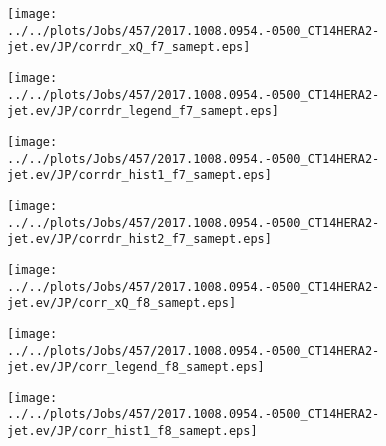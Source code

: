 \documentclass[12pt]{article}
\begin{document}
\begin{figure}
\texttt{[image: ../../plots/Jobs/457/2017.1008.0954.-0500\_CT14HERA2-jet.ev/JP/corrdr\_xQ\_f7\_samept.eps]}
\caption{}
\end{figure}\newpage\clearpage
\begin{figure}
\texttt{[image: ../../plots/Jobs/457/2017.1008.0954.-0500\_CT14HERA2-jet.ev/JP/corrdr\_legend\_f7\_samept.eps]}
\caption{}
\end{figure}\newpage\clearpage
\begin{figure}
\texttt{[image: ../../plots/Jobs/457/2017.1008.0954.-0500\_CT14HERA2-jet.ev/JP/corrdr\_hist1\_f7\_samept.eps]}
\caption{}
\end{figure}\newpage\clearpage
\begin{figure}
\texttt{[image: ../../plots/Jobs/457/2017.1008.0954.-0500\_CT14HERA2-jet.ev/JP/corrdr\_hist2\_f7\_samept.eps]}
\caption{}
\end{figure}\newpage\clearpage
\begin{figure}
\texttt{[image: ../../plots/Jobs/457/2017.1008.0954.-0500\_CT14HERA2-jet.ev/JP/corr\_xQ\_f8\_samept.eps]}
\caption{}
\end{figure}\newpage\clearpage
\begin{figure}
\texttt{[image: ../../plots/Jobs/457/2017.1008.0954.-0500\_CT14HERA2-jet.ev/JP/corr\_legend\_f8\_samept.eps]}
\caption{}
\end{figure}\newpage\clearpage
\begin{figure}
\texttt{[image: ../../plots/Jobs/457/2017.1008.0954.-0500\_CT14HERA2-jet.ev/JP/corr\_hist1\_f8\_samept.eps]}
\caption{}
\end{figure}\newpage\clearpage
\end{document}
